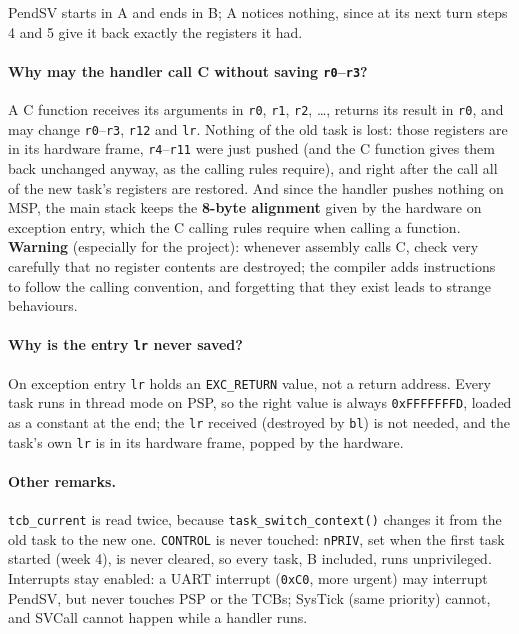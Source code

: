 PendSV starts in A and ends in B; A notices nothing, since at its next turn steps 4 and 5 give it back exactly the registers it had.

\paragraph{Why may the handler call C without saving \texttt{r0}--\texttt{r3}?} A C function receives its arguments in \texttt{r0}, \texttt{r1}, \texttt{r2}, \dots, returns its result in \texttt{r0}, and may change \texttt{r0}--\texttt{r3}, \texttt{r12} and \texttt{lr}. Nothing of the old task is lost: those registers are in its hardware frame, \texttt{r4}--\texttt{r11} were just pushed (and the C function gives them back unchanged anyway, as the calling rules require), and right after the call all of the new task's registers are restored. And since the handler pushes nothing on MSP, the main stack keeps the \textbf{8-byte alignment} given by the hardware on exception entry, which the C calling rules require when calling a function. \textbf{Warning} (especially for the project): whenever assembly calls C, check very carefully that no register contents are destroyed; the compiler adds instructions to follow the calling convention, and forgetting that they exist leads to strange behaviours.

\paragraph{Why is the entry \texttt{lr} never saved?} On exception entry \texttt{lr} holds an \texttt{EXC\_RETURN} value, not a return address. Every task runs in thread mode on PSP, so the right value is always \texttt{0xFFFFFFFD}, loaded as a constant at the end; the \texttt{lr} received (destroyed by \texttt{bl}) is not needed, and the task's own \texttt{lr} is in its hardware frame, popped by the hardware.

\paragraph{Other remarks.} \texttt{tcb\_current} is read twice, because \texttt{task\_switch\_context()} changes it from the old task to the new one. \texttt{CONTROL} is never touched: \texttt{nPRIV}, set when the first task started (week 4), is never cleared, so every task, B included, runs unprivileged. Interrupts stay enabled: a UART interrupt (\texttt{0xC0}, more urgent) may interrupt PendSV, but never touches PSP or the TCBs; SysTick (same priority) cannot, and SVCall cannot happen while a handler runs.

